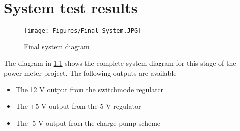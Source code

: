 \chapter{System test results}

\begin{figure}[h]
    \centering
    \texttt{[image: Figures/Final\_System.JPG]}
    \caption{Final system diagram}
    \label{fig:Final}
\end{figure}

The diagram in \ref{fig:Final} shows the complete system diagram for this stage of the power meter project.
The following outputs are available

\begin{itemize}
    \item The 12 V output from the switchmode regulator
    \item The +5 V output from the 5 V regulator
    \item The -5 V output from the charge pump scheme
\end{itemize}








